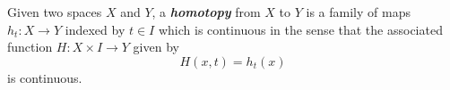 \documentclass[preview]{standalone}
\begin{document}
\begin{center}
Given two spaces $X$ and $Y$, a \textbf{\textit{homotopy}} from $X$ to $Y$ is a family of maps $h_t : X \to Y$ indexed by $t \in I$ which is continuous in the sense that the associated function $H : X \times I \to Y$ given by $$H(x,t) = h_t(x)$$ is continuous.
\end{center}
\end{document}
